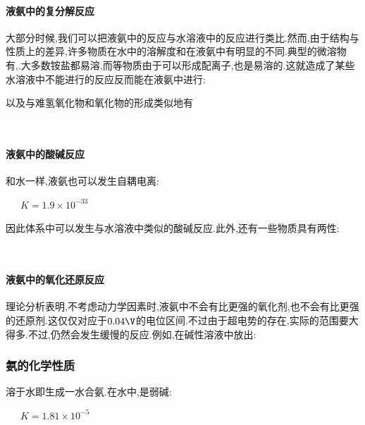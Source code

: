 \documentclass{ctexart}
\begin{document}
\paragraph{液氨中的复分解反应}
大部分时候,我们可以把液氨中的反应与水溶液中的反应进行类比.然而,由于结构与性质上的差异,许多物质在水中的溶解度和在液氨中有明显的不同.典型的微溶物有,.大多数铵盐都易溶,而等物质由于可以形成配离子,也是易溶的.这就造成了某些水溶液中不能进行的反应反而能在液氨中进行:
\begin{center}
\end{center}
以及与难氢氧化物和氧化物的形成类似地有
\begin{center}
    \\
\end{center}
\paragraph{液氨中的酸碱反应}
和水一样,液氨也可以发生自耦电离:
\begin{center}
    \ \ \ $K=1.9\times10^{-33}$
\end{center}
因此体系中可以发生与水溶液中类似的酸碱反应.此外,还有一些物质具有两性:
\begin{center}
    \\
\end{center}
\paragraph{液氨中的氧化还原反应}
理论分析表明,不考虑动力学因素时,液氨中不会有比更强的氧化剂,也不会有比更强的还原剂.这仅仅对应于$0.04\V$的电位区间.不过由于超电势的存在,实际的范围要大得多.不过,仍然会发生缓慢的反应.例如,在碱性溶液中放出:
\begin{center}
\end{center}
\subsubsection{氨的化学性质}
溶于水即生成一水合氨.在水中,是弱碱:
\begin{center}
    \ \ \ $K=1.81\times10^{-5}$
\end{center}
\end{document}
